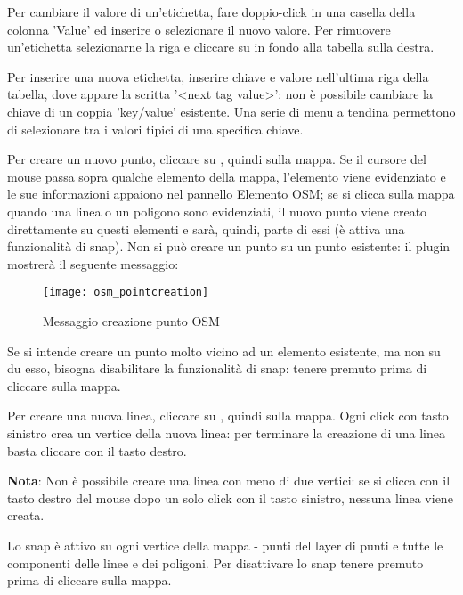 Per cambiare il valore di un'etichetta, fare doppio-click in una casella della colonna 'Value' 
ed inserire o selezionare il nuovo valore. Per rimuovere un'etichetta selezionarne la riga 
e cliccare su  in fondo alla tabella sulla destra.

Per inserire una nuova etichetta, inserire chiave e valore nell'ultima riga della tabella, 
dove appare la scritta '<next tag value>': non è possibile cambiare la chiave di un coppia 
'key/value' esistente. 
Una serie di menu a tendina permettono di selezionare tra i valori tipici di una specifica chiave.


Per creare un nuovo punto, cliccare su , quindi sulla mappa.
Se il cursore del mouse passa sopra qualche elemento della mappa, l'elemento viene evidenziato
e le sue informazioni appaiono nel pannello Elemento OSM; se si clicca sulla mappa quando una linea o 
un poligono sono evidenziati, il nuovo punto viene creato direttamente su questi elementi e 
sarà, quindi, parte di essi (è attiva una funzionalità di snap). 
Non si può creare un punto su un punto esistente: il plugin 
mostrerà il seguente messaggio: 

\begin{figure}[ht]
   \centering
   \texttt{[image: osm\_pointcreation]}
   \caption{Messaggio creazione punto OSM \nixcaption}\label{fig:osmpoicreat}
\end{figure}

Se si intende creare un punto molto vicino ad un elemento esistente, ma non su du esso, 
bisogna disabilitare la funzionalità di snap: tenere premuto  prima di cliccare sulla 
mappa.


Per creare una nuova linea, cliccare su , quindi sulla mappa.
Ogni click con tasto sinistro crea un vertice della nuova linea: per terminare la 
creazione di una linea basta cliccare con il tasto destro.

\textbf{Nota}: Non è possibile creare una linea con meno di due vertici: se si clicca con il tasto 
destro del mouse dopo un solo click con il tasto sinistro, nessuna linea viene creata.

Lo snap è attivo su ogni vertice della mappa - punti del layer di punti e tutte le componenti delle linee 
e dei poligoni. Per disattivare lo snap tenere premuto  prima di cliccare sulla 
mappa.

